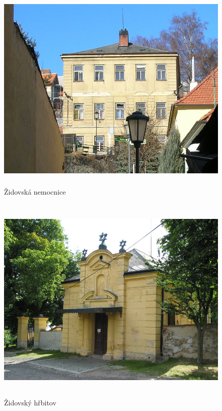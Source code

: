 \documentclass[a4paper,oneside,12pt]{report}
\begin{document}
\begin{figure}
	\centering
	\includegraphics[height=10cm]{../img/zidovskaNemocniceBudova.jpg}
	\caption[Židovská nemocnice \text{[online]} Wikipedia. Dostupné z: \url{https://cs.wikipedia.org/wiki/Soubor:Trebic_zamosti_krankenhaus.jpg} \text{[cit. 2020-03-28]}]{
		Židovská nemocnice
	}
	\label{fig:znb}
\end{figure}

\begin{figure}
	\centering
	\includegraphics[height=10cm]{../img/zidovskyHrbitov.jpg}
	\caption[Židovský hřbitov \text{[online]} Město Třebíč. Dostupné z: \url{http://www.mesto-trebic.cz/zidovsky-hrbitov.php} \text{[cit. 2020-03-28]}]{
		Židovský hřbitov
	}
	\label{fig:zhh}
\end{figure}
\end{document}
